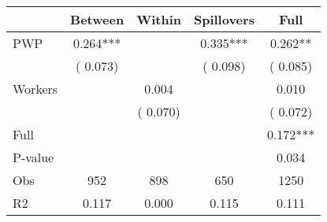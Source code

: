 
\begin{tabular}{l*{4}{c}}\hline&\multicolumn{1}{c}{Between}&\multicolumn{1}{c}{Within}&\multicolumn{1}{c}{Spillovers}&\multicolumn{1}{c}{Full}\\ \hline
 PWP           &              0.264***      &                                               &        0.335*** &         0.262**                            \\ 
                               &        (       0.073)           &                                       &       (       0.098)     &      (       0.085)                                           \\ 
 Workers       &                                               &        0.004    &                                &             0.010                            \\ 
                               &                                               & (       0.070)                  &                                        &      (       0.072)                                           \\ 
\hline                                                                                                                                                                                                                                            
 Full                  &                                               &                                               &                                        &             0.172***                                     \\ 
 P-value               &                                               &                                               &                                        &             0.034                                           \\ 
 Obs                   &               952               &       898                       &       650                &              1250                                               \\ 
 R2                    &                      0.117              &              0.000                      &              0.115               &                     0.111                                              \\ 
\hline \end{tabular}                                                                                                                                                                                                              